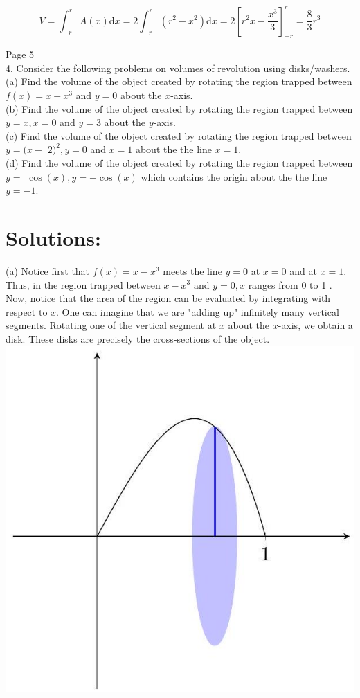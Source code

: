 \documentclass[10pt]{article}
\begin{document}
$$
V=\int_{-r}^{r} A(x) \mathrm{d} x=2 \int_{-r}^{r}\left(r^{2}-x^{2}\right) \mathrm{d} x=2\left[r^{2} x-\frac{x^{3}}{3}\right]_{-r}^{r}=\frac{8}{3} r^{3}
$$

Page 5\\
4. Consider the following problems on volumes of revolution using disks/washers.\\
(a) Find the volume of the object created by rotating the region trapped between $f(x)=x-x^{3}$ and $y=0$ about the $x$-axis.\\
(b) Find the volume of the object created by rotating the region trapped between $y=x, x=0$ and $y=3$ about the $y$-axis.\\
(c) Find the volume of the object created by rotating the region trapped between $y=(x-$ $2)^{2}, y=0$ and $x=1$ about the the line $x=1$.\\
(d) Find the volume of the object created by rotating the region trapped between $y=$ $\cos (x), y=-\cos (x)$ which contains the origin about the the line $y=-1$.

\section*{Solutions:}
(a) Notice first that $f(x)=x-x^{3}$ meets the line $y=0$ at $x=0$ and at $x=1$. Thus, in the region trapped between $x-x^{3}$ and $y=0, x$ ranges from 0 to 1 . Now, notice that the area of the region can be evaluated by integrating with respect to $x$. One can imagine that we are "adding up" infinitely many vertical segments. Rotating one of the vertical segment at $x$ about the $x$-axis, we obtain a disk. These disks are precisely the cross-sections of the object.\\
\includegraphics[max width=\textwidth, center]{2024_12_27_3b8e65ac2e3b34a6249eg-6}
\end{document}
